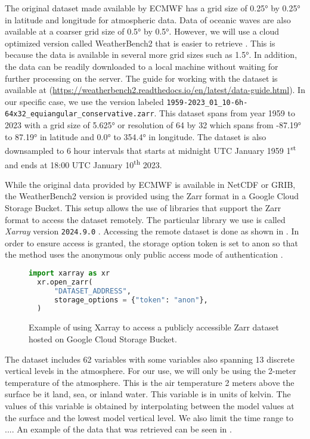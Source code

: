 The original dataset made available by ECMWF has a grid size of \ang{0.25} by \ang{0.25} in latitude and longitude for atmospheric data. Data of oceanic waves are also available at a coarser grid size of \ang{0.5} by \ang{0.5}. However, we will use a cloud optimized version called WeatherBench2 that is easier to retrieve \autocite{raspWeatherBench2Benchmark2023}. This is because the data is available in several more grid sizes such as \ang{1.5}. In addition, the data can be readily downloaded to a local machine without waiting for further processing on the server. The guide for working with the dataset is available at (\url{https://weatherbench2.readthedocs.io/en/latest/data-guide.html}). In our specific case, we use the version labeled \verb|1959-2023_01_10-6h-64x32_equiangular_conservative.zarr|. This dataset spans from year 1959 to 2023 with a grid size of \ang{5.625} or resolution of 64 by 32 which spans from \ang{-87.19} to \ang{87.19} in latitude and \ang{0.0} to \ang{354.4} in longitude. The dataset is also downsampled to 6 hour intervals that starts at midnight UTC January 1959 1\textsuperscript{st} and ends at 18:00 UTC January 10\textsuperscript{th} 2023.

While the original data provided by ECMWF is available in NetCDF or GRIB, the WeatherBench2 version is provided using the Zarr format in a Google Cloud Storage Bucket. This setup allows the use of libraries that support the Zarr format to access the dataset remotely. The particular library we use is called \emph{Xarray} version \verb|2024.9.0| \autocite{hoyer2017xarray,hoyerXarray2024}. Accessing the remote dataset is done as shown in . In order to ensure access is granted, the storage option token is set to anon so that the method uses the anonymous only public access mode of authentication \autocite{GCSFSGCSFs2023122post1+1g8e500c6dirty}.

\begin{figure}[H]
  \centering
  \begin{lstlisting}[language=Python]
  import xarray as xr
  xr.open_zarr(
      "DATASET_ADDRESS",
      storage_options = {"token": "anon"},
  )
  \end{lstlisting}
  \caption{Example of using Xarray to access a publicly accessible Zarr dataset hosted on Google Cloud Storage Bucket.} \label{fig:access_remote_zarr}
\end{figure}

The dataset includes 62 variables with some variables also spanning 13 discrete vertical levels in the atmosphere. For our use, we will only be using the 2-meter temperature of the atmosphere. This is the air temperature 2 meters above the surface be it land, sea, or inland water. This variable is in units of kelvin. The values of this variable is obtained by interpolating between the model values at the surface and the lowest model vertical level. We also limit the time range to .... An example of the data that was retrieved can be seen in .

